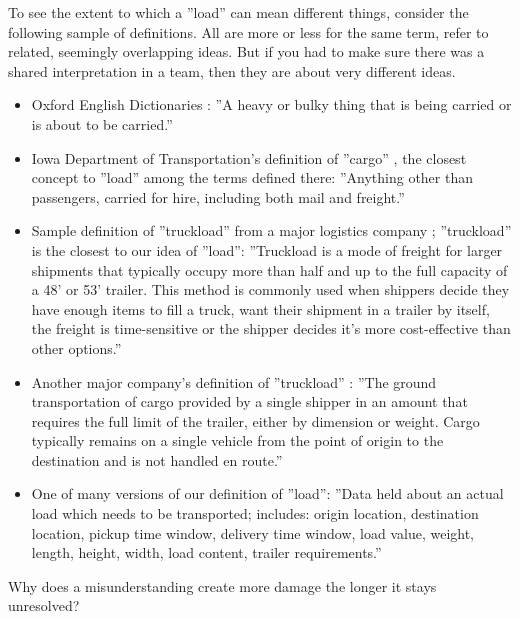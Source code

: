 \documentclass[graybox,envcountchap,sectrefs]{svmono}
\begin{document}
To see the extent to which a ''load'' can mean different things, consider the following sample of definitions. All are more or less for the same term, refer to related, seemingly overlapping ideas. But if you had to make sure there was a shared interpretation in a team, then they are about very different ideas.

\begin{itemize}
    \item Oxford English Dictionaries \cite{oed-load}: ''A heavy or bulky thing that is being carried or is about to be carried.'' 
    \item Iowa Department of Transportation's definition of ''cargo'' \cite{iowa-dot-cargo}, the closest concept to ''load'' among the terms defined there: ''Anything other than passengers, carried for hire, including both mail and freight.''
    \item Sample definition of ''truckload'' from a major logistics company \cite{chrobinson-truckload}; ''truckload'' is the closest to our idea of ''load'': ''Truckload is a mode of freight for larger shipments that typically occupy more than half and up to the full capacity of a 48’ or 53’ trailer. This method is commonly used when shippers decide they have enough items to fill a truck, want their shipment in a trailer by itself, the freight is time-sensitive or the shipper decides it’s more cost-effective than other options.''
    \item Another major company's definition of ''truckload'' \cite{xpolog-inv-pres-aug-2019}: ''The ground transportation of cargo provided by a single shipper in an amount that requires the full limit of the trailer, either by dimension or weight. Cargo typically remains on a single vehicle from the point of origin to the destination and is not handled en route.''
    \item One of many versions of our definition of ''load'': ''Data held about an actual load which needs to be transported; includes: origin location, destination location, pickup time window, delivery time window, load value, weight, length, height, width, load content, trailer requirements.''
\end{itemize}

\noindent Why does a misunderstanding create more damage the longer it stays unresolved? 
\end{document}
